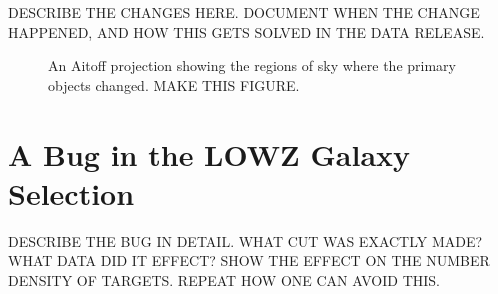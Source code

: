 \documentclass[preprint]{aastex}
\begin{document}
DESCRIBE THE CHANGES HERE. DOCUMENT WHEN THE CHANGE HAPPENED, AND HOW THIS 
GETS SOLVED IN THE DATA RELEASE.

\begin{figure}
\caption{An Aitoff projection showing the regions of sky where the primary
objects changed. MAKE THIS FIGURE.}
\end{figure}

\section{A Bug in the LOWZ Galaxy Selection}
\label{app:lowzbug}

DESCRIBE THE BUG IN DETAIL. WHAT CUT WAS EXACTLY MADE? WHAT DATA DID IT EFFECT?
SHOW THE EFFECT ON THE NUMBER DENSITY OF TARGETS. REPEAT HOW ONE CAN AVOID THIS.
\end{document}
